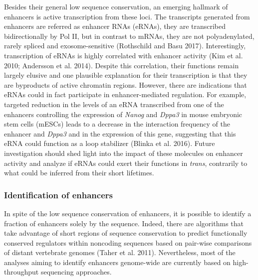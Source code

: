 Besides their general low sequence conservation, an emerging hallmark of enhancers is active transcription from these loci. The transcripts generated from enhancers are referred as enhancer RNAs (eRNAs), they are transcribed bidirectionally by Pol II, but in contrast to mRNAs, they are not polyadenylated, rarely spliced and exosome-sensitive (Rothschild and Basu 2017). Interestingly, transcription of eRNAs is highly correlated with enhancer activity (Kim et al. 2010; Andersson et al. 2014). Despite this correlation, their functions remain largely elusive and one plausible explanation for their transcription is that they are byproducts of active chromatin regions. However, there are indications that eRNAs could in fact participate in enhancer-mediated regulation. For example, targeted reduction in the levels of an eRNA transcribed from one of the enhancers controlling the expression of \textit{Nanog} and \textit{Dppa3} in mouse embryonic stem cells (mESCs) leads to a decrease in the interaction frequency of the enhancer and \textit{Dppa3} and in the expression of this gene, suggesting that this eRNA could function as a loop stabilizer (Blinka et al. 2016). Future investigation should shed light into the impact of these molecules on enhancer activity and analyze if eRNAs could exert their functions in \textit{trans}, contrarily to what could be inferred from their short lifetimes.\\

		\subsubsection{Identification of enhancers}

In spite of the low sequence conservation of enhancers, it is possible to identify a fraction of enhancers solely by the sequence. Indeed, there are algorithms that take advantage of short regions of sequence conservation to predict functionally conserved regulators within noncoding sequences based on pair-wise comparisons of distant vertebrate genomes (Taher et al. 2011). Nevertheless, most of the analyses aiming to identify enhancers genome-wide are currently based on high-throughput sequencing approaches.\\

